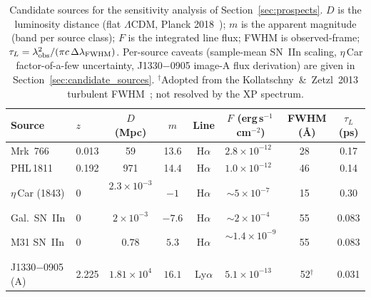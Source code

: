 \documentclass[aps,prd,onecolumn,amsmath,amssymb]{revtex4-2}
\begin{document}
\begin{table}[t]
\centering
\caption{Candidate sources for the sensitivity analysis of
Section~\ref{sec:prospects}.
$D$ is the luminosity distance (flat $\Lambda$CDM, Planck
2018~\cite{Aghanim2020}); $m$ is the apparent magnitude (band per
source class); $F$ is the integrated line flux; FWHM is observed-frame;
$\tau_L = \lambda_{\rm obs}^2/(\pi c\,\Delta\lambda_{\rm FWHM})$.
Per-source caveats (sample-mean SN~IIn scaling, $\eta$\,Car
factor-of-a-few uncertainty, J1330$-$0905 image-A flux derivation) are
given in Section~\ref{sec:candidate_sources}.
$^{\dagger}$Adopted from the Kollatschny~\&~Zetzl~2013 turbulent
FWHM~\cite{Kollatschny2013}; not resolved by the XP spectrum.}
\label{tab:source_agn}
\begin{tabular}{llcccccc}
\toprule
Source & $z$ & $D$ (Mpc) & $m$ & Line & $F$ (erg\,s$^{-1}$\,cm$^{-2}$) & FWHM (\AA) & $\tau_L$ (ps) \\
\midrule
Mrk~766          & 0.013 &  59                 & 13.6 & H$\alpha$ & $2.8\times10^{-12}$~\cite{RodriguezArdila2006}                    &  28~\cite{Kollatschny2013} & 0.17  \\
PHL\,1811        & 0.192 & 971                 & 14.4 & H$\alpha$ & $1.0\times10^{-12}$~\cite{Leighly2007}                            &  46~\cite{Leighly2007}     & 0.14  \\
$\eta$\,Car (1843) & 0   & $2.3\times10^{-3}$~\cite{2001ApJ...553..837H}  & $-1$   & H$\alpha$ & ${\sim}5\times10^{-7}$~\cite{2018MNRAS.480.1466S}                  &  15~\cite{2018MNRAS.480.1466S} & 0.30  \\
Gal.\ SN~IIn     & 0     & $2\times10^{-3}$    & $-7.6$ & H$\alpha$ & ${\sim}2\times10^{-4}$~\cite{Taddia2013,2025ApJ...987...13R} &  55~\cite{Taddia2013} & 0.083 \\
M31 SN~IIn       & 0     & $0.78$              & $5.3$  & H$\alpha$ & ${\sim}1.4\times10^{-9}$~\cite{Taddia2013,2025ApJ...987...13R} &  55~\cite{Taddia2013} & 0.083 \\
J1330$-$0905 (A) & 2.225 & $1.81\times10^{4}$  & $16.1$ & Ly$\alpha$ & $5.1\times10^{-13}$~\cite{PersephonesTorch} &  52$^{\dagger}$        & 0.031 \\
\bottomrule
\end{tabular}
\end{table}
\end{document}

